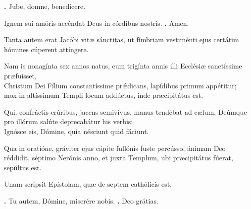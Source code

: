 \begin{small}
\textbf{\Vbar.} Jube, domne, benedícere.

Ignem sui amóris accéndat Deus in córdibus nostris.
\textbf{\Rbar.} Amen.
\end{small}


Tanta autem erat Jacóbi vitæ sánctitas, ut fímbriam vestiménti ejus certátim hómines cúperent attíngere. 

Nam is nonagínta sex annos natus, cum trigínta annis illi Ecclésiæ sanctíssime præfuísset, \\
Christum Dei Fílium constantíssime prǽdicans, lapídibus primum appétitur; \\
mox in altíssimum Templi locum addúctus, inde præcipitátus est. 

Qui, confráctis crúribus, jacens semivívus, manus tendébat ad cælum, Deúmque pro illórum salúte deprecabátur his verbis: \\
Ignósce eis, Dómine, quia nésciunt quid fáciunt. 

Qua in oratióne, gráviter ejus cápite fullónis fuste percússo, ánimam Deo réddidit, séptimo Nerónis anno, et juxta Templum, ubi præcipitátus fúerat, sepúltus est. 

Unam scripsit Epístolam, quæ de septem cathólicis est.

\textbf{\Vbar.} Tu autem, Dómine, miserére nobis.
\textbf{\Rbar.} Deo grátias.

